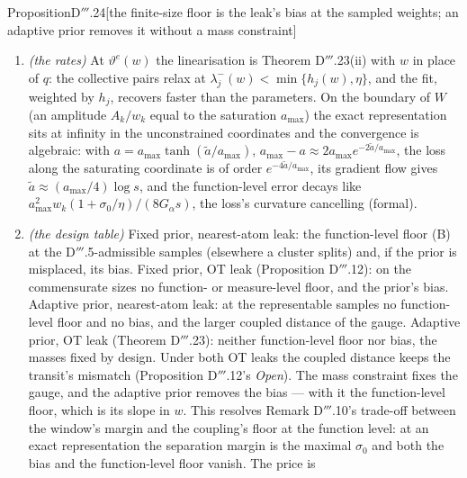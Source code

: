 \begin{thm}{Proposition}{D$'''$.24}[the finite-size floor is the leak's bias at the sampled weights; an adaptive prior
removes it without a mass constraint]
\begin{enumerate}[label=\textup{(\roman*)}]
    moves all of it into the parameters. Since $S^e = -\partial_wx^0$, the bound of (i) is $\sigma_0/4$ times the
    adaptive prior's coupled-distance law: the fixed prior's function-level law is at most $\sigma_0/4$ times the
    adaptive prior's parameter-level law. At the measure level the two priors hardly differ: between the stationary
    measures of two samples, $W^2$ is the transport of the mass $\frac12\norm{w - w'}_1$ across the inter-cluster
    distances, of order $\norm{w - w'}_1\sim m^{-1/2}$ under both priors, plus a within-class part of order
    $\norm{w - w'}^2$, the larger under the adaptive prior.
  \item \emph{(the rates)} At $\vartheta^e(w)$ the linearisation is Theorem D$'''$.23(ii) with $w$ in place of $q$:
    the collective pairs relax at $\lambda_j^-(w) < \min\{h_j(w),\eta\}$, and the fit, weighted by $h_j$, recovers
    faster than the parameters. On the boundary of $W$ (an amplitude $A_k/w_k$ equal to the saturation $a_{\max}$)
    the exact representation sits at infinity in the unconstrained coordinates and the convergence is algebraic: with
    $a = a_{\max}\tanh(\tilde a/a_{\max})$, $a_{\max} - a\approx2a_{\max}e^{-2\tilde a/a_{\max}}$, the loss along the
    saturating coordinate is of order $e^{-4\tilde a/a_{\max}}$, its gradient flow gives
    $\tilde a\approx(a_{\max}/4)\log s$, and the function-level error decays like
    $a_{\max}^2w_k(1 + \sigma_0/\eta)/(8G_\alpha s)$, the loss's curvature cancelling (formal).
  \item \emph{(the design table)} Fixed prior, nearest-atom leak: the function-level floor \textup{(B)} at the
    D$'''$.5-admissible samples (elsewhere a cluster splits) and, if the prior is misplaced, its bias. Fixed prior, OT
    leak (Proposition D$'''$.12): on the commensurate sizes no function- or measure-level floor, and the prior's bias.
    Adaptive prior, nearest-atom leak: at the representable samples no function-level floor and no bias, and the
    larger coupled distance of the gauge. Adaptive prior, OT leak (Theorem D$'''$.23): neither function-level floor nor
    bias, the masses fixed by design. Under both OT leaks the coupled distance keeps the transit's mismatch
    (Proposition D$'''$.12's \emph{Open}). The mass constraint fixes the gauge, and the adaptive prior removes the bias
    --- with it the function-level floor, which is its slope in $w$. This resolves Remark D$'''$.10's trade-off
    between the window's margin and the coupling's floor at the function level: at an exact representation the
    separation margin is the maximal $\sigma_0$ and both the bias and the function-level floor vanish. The price is

\end{enumerate}
\end{thm}
